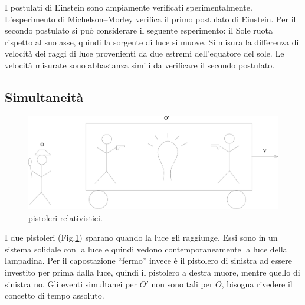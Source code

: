 I postulati di Einstein sono ampiamente verificati sperimentalmente. L'esperimento di Michelson--Morley verifica il primo postulato di Einstein. Per il secondo postulato si può considerare il seguente esperimento: il Sole ruota rispetto al suo asse, quindi la sorgente di luce si muove. Si misura la differenza di velocità dei raggi di luce provenienti da due estremi dell'equatore del sole. Le velocità misurate sono abbastanza simili da verificare il secondo postulato.

\subsection{Simultaneità}

\begin{figure}[htbp]
   \centering
   \includegraphics[scale=0.2]{immagini/fisica1/pistoleri}
   \caption{pistoleri relativistici.}
   \label{pistoleri}
\end{figure}


I due pistoleri (Fig.\@ \ref{pistoleri}) sparano quando la luce gli raggiunge. Essi sono in un sistema solidale con la luce e quindi vedono contemporaneamente la luce della lampadina. Per il capostazione ``fermo'' invece è il pistolero di sinistra ad essere investito per prima dalla luce, quindi il pistolero a destra muore, mentre quello di sinistra no. Gli eventi simultanei per $O'$ non sono tali per $O$, bisogna rivedere il concetto di tempo assoluto.

